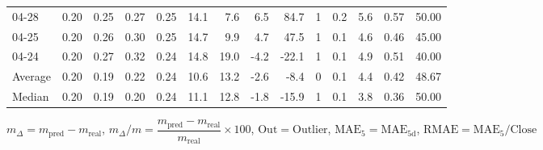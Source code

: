 \begin{threeparttable}
{\begin{tabular}{lrrrrrrrrrrrrr}
  04-28 &          0.20 &          0.25 &          0.27 &        0.25 &                14.1 &                 7.6 &        6.5 &         84.7 &              1 &                 0.2 &              5.6 &            0.57 &                  50.00 \\
  04-25 &          0.20 &          0.26 &          0.30 &        0.25 &                14.7 &                 9.9 &        4.7 &         47.5 &              1 &                 0.1 &              4.6 &            0.46 &                  45.00 \\
  04-24 &          0.20 &          0.27 &          0.32 &        0.24 &                14.8 &                19.0 &       -4.2 &        -22.1 &              1 &                 0.1 &              4.9 &            0.51 &                  40.00 \\
Average &          0.20 &          0.19 &          0.22 &        0.24 &                10.6 &                13.2 &       -2.6 &         -8.4 &              0 &                 0.1 &              4.4 &            0.42 &                  48.67 \\
 Median &          0.20 &          0.19 &          0.20 &        0.24 &                11.1 &                12.8 &       -1.8 &        -15.9 &              1 &                 0.1 &              3.8 &            0.36 &                  50.00 \\
\bottomrule
\end{tabular}
}
\begin{tablenotes}\footnotesize
\item $m_\Delta=m_{\text{pred}}-m_{\text{real}}$,
$m_\Delta/m=\dfrac{m_{\text{pred}}-m_{\text{real}}}{m_{\text{real}}}\times100$,
$\mathrm{Out}=\text{Outlier}$,
$\mathrm{MAE}_5=\mathrm{MAE}_{5\text{d}}$,
$\mathrm{RMAE}=\mathrm{MAE}_5/\text{Close}$
\end{tablenotes}
\end{threeparttable}
\endgroup

